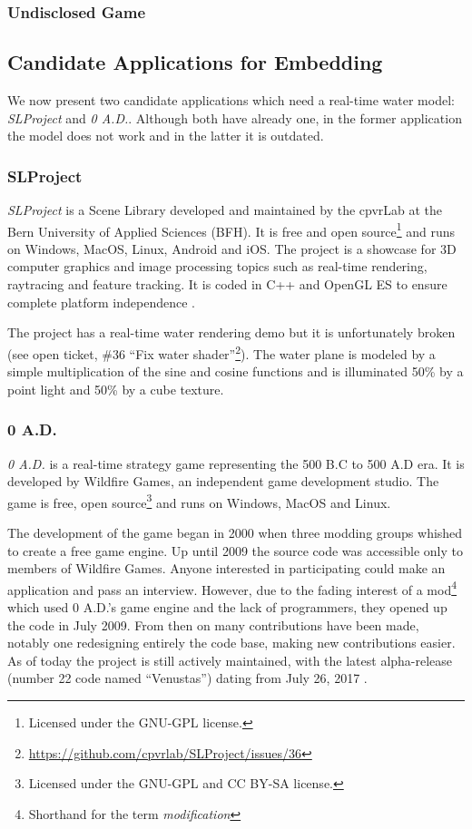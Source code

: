 \subsubsection{Undisclosed Game}\label{subsub:undisclosed_game}

\subsection{Candidate Applications for Embedding}\label{subsec:candidate_apps}

We now present two candidate applications which need a real-time water model:
\textit{SLProject} and \textit{0 A.D.}. Although both have already one,
in the former application the model does not work and in the latter it is
outdated.


\subsubsection{SLProject}

\textit{SLProject} is a Scene Library developed and maintained by the cpvrLab at
the Bern University of Applied Sciences (BFH). It is free and open
source\footnote{Licensed under the GNU-GPL license.} and runs on Windows, MacOS,
Linux, Android and iOS\@. The project is a showcase for 3D computer graphics and
image processing topics such as real-time rendering, raytracing and feature
tracking. It is coded in C++ and OpenGL ES to ensure complete platform
independence \autocite{hudritch2017slproject, slproject2017doxygen}.

The project has a real-time water rendering demo but it is unfortunately broken
(see open ticket, \#36 ``Fix water
shader''\footnote{\url{https://github.com/cpvrlab/SLProject/issues/36}}). The
water plane is modeled by a simple multiplication of the sine and cosine
functions and is illuminated 50\% by a point light and 50\% by a cube texture.


\subsubsection{0 A.D.}

\textit{0 A.D.} is a real-time strategy game representing the 500 B.C to 500 A.D
era. It is developed by Wildfire Games, an independent game development studio.
The game is free, open source\footnote{Licensed under the GNU-GPL and CC BY-SA
license.} and runs on Windows, MacOS and Linux.

The development of the game began in 2000 when three modding groups whished to
create a free game engine. Up until 2009 the source code was accessible only to
members of Wildfire Games. Anyone interested in participating could make an
application and pass an interview. However, due to the fading interest of a
mod\footnote{Shorthand for the term \textit{modification}} which used 0 A.D.'s
game engine and the lack of programmers, they opened up the code in July 2009.
From then on many contributions have been made, notably one redesigning entirely
the code base, making new contributions easier. As of today the project is still
actively maintained, with the latest alpha-release (number 22 code named
``Venustas'') dating from July 26,
2017 \autocite{wildfire0adproject,wildfire0adstory}.

